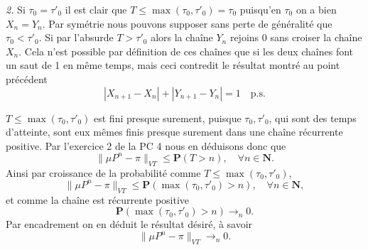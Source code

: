 \documentclass[12pt]{article}
\newcommand{\N}{\mathbf{N}}
\begin{document}
\medskip

\textit{2.} Si $\tau_{0} = \tau'_{0}$ il est clair que $T \le \max(\tau_{0}, \tau'_{0}) = \tau_{0}$ puisqu'en $\tau_{0}$ on a bien $X_{n} = Y_{n}$. Par symétrie nous pouvons supposer sans perte de généralité que $\tau_{0} < \tau'_{0}$. Si par l'absurde $T > \tau'_{0}$ alors la chaîne $Y_{n}$ rejoins 0 sans croiser la chaîne $X_{n}$. Cela n'est possible par définition de ces chaînes que si les deux chaînes font un saut de 1 en même temps, mais ceci contredit le résultat montré au point précédent \[
|X_{n+1}-X_{n}|+|Y_{n+1}-Y_{n}| = 1 \quad \text{p.s.}
\]  

$T \le \max(\tau_{0}, \tau'_{0})$ est fini presque surement, puisque $\tau_{0}, \tau'_{0}$, qui sont des temps d'atteinte, sont eux mêmes finis presque surement dans une chaîne récurrente positive. Par l'exercice 2 de la PC 4 nous en déduisons donc que \[
        \|\mu P^{n}-\pi\|_{VT} \le \mathbf{P}(T>n), \quad \forall n \in \N
        .\] Ainsi par croissance de la probabilité comme $T \le \max(\tau_{0}, \tau'_{0})$, \[
        \|\mu P^{n}-\pi\|_{VT} \le \mathbf{P}(\max(\tau_{0}, \tau'_{0})>n), \quad \forall n \in \N
,\] et comme la chaîne est récurrente positive \[
\mathbf{P}(\max(\tau_{0}, \tau'_{0}) > n) \to_{n} 0
.\]  
Par encadrement on en déduit le résultat désiré, à savoir \[
\|\mu P^{n} - \pi\|_{VT} \to_{n} 0
.\] 
\end{document}
